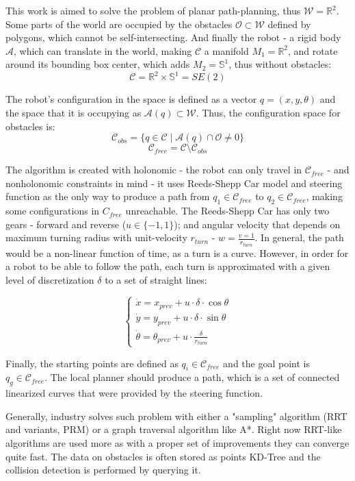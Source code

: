 \documentclass[12pt]{article}
\DeclareRobustCommand{\[}{\begin{equation}}
\DeclareRobustCommand{\]}{\end{equation}}
\numberwithin{equation}{section}
\begin{document}
This work is aimed to solve the problem of planar path-planning, thus $\mathcal{W}=\mathbb{R}^2$. Some parts of the world are occupied by the obstacles $\mathcal{O}\subset\mathcal{W}$ defined by polygons, which cannot be self-intersecting. And finally the robot - a rigid body $\mathcal{A}$,
which can translate in the world, making $\mathcal{C}$ a manifold $M_1=\mathbb{R}^2$, and rotate around its bounding box center, which adds $M_2=\mathbb{S}^1$, thus without obstacles:
\[
\mathcal{C}=\mathbb{R}^2\times\mathbb{S}^1=SE(2)
\]

The robot's configuration in the space is defined as a vector $q=(x,y,\theta)$ and the space that it is occupying as $\mathcal{A}(q)\subset\mathcal{W}$.
Thus, the configuration space for obstacles is:
\[
\mathcal{C}_{obs}=\{q\in\mathcal{C}\mid\mathcal{A}(q)\cap\mathcal{O}\neq0 \}
\]
\[
\mathcal{C}_{free}=\mathcal{C}\setminus\mathcal{C}_{obs}
\]

The algorithm is created with holonomic - the robot can only travel in $\mathcal{C}_{free}$ - and nonholonomic constraints in mind - it uses Reeds-Shepp Car model and steering function as the only way to produce a path from $q_1\in\mathcal{C}_{free}$ to $q_2\in\mathcal{C}_{free}$, making some configurations in $C_{free}$ unreachable. The Reeds-Shepp Car has only two gears - forward and reverse ($u\in\{-1,1\}$); and angular velocity that depends on maximum turning radius with unit-velocity $r_{turn}$ - $w = \frac{v=1}{r_{turn}}$. In general, the path would be a non-linear function of time, as a turn is a curve. However, in order for a robot to be able to follow the path, each turn is approximated with a given level of discretization $\delta$ to a set of straight lines:

\[
\begin{cases}
\dot{x}=x_{prev} + u\cdot\delta\cdot\cos{\theta}\\
\dot{y}=y_{prev} + u\cdot\delta\cdot\sin{\theta}\\
\dot{\theta}=\theta_{prev}+u\cdot \frac{\delta}{r_{turn}}
\end{cases}
\]

Finally, the starting points are defined as $q_i\in\mathcal{C}_{free}$ and the goal point is $q_g\in\mathcal{C}_{free}$. The local planner should produce a path, which is a set of connected linearized curves that were provided by the steering function.

Generally, industry solves such problem with either a "sampling" algorithm (RRT and variants, PRM) or a graph traversal algorithm like A*. Right now RRT-like algorithms are used more as with a proper set of improvements they can converge quite fast. The data on obstacles is often stored as points KD-Tree and the collision detection is performed by querying it. 
\end{document}
